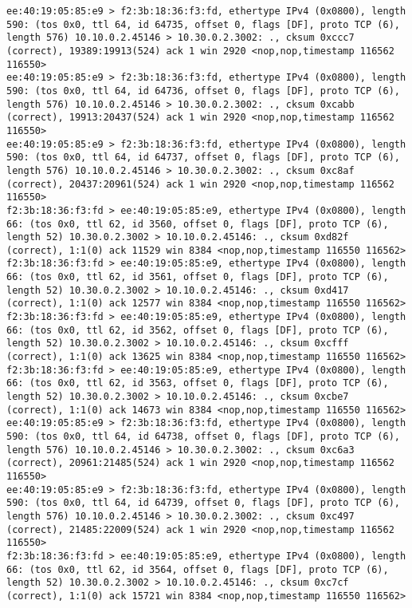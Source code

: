 \documentclass[a4paper,12pt]{article}
\begin{document}
\begin{Verbatim}
ee:40:19:05:85:e9 > f2:3b:18:36:f3:fd, ethertype IPv4 (0x0800), length 590: (tos 0x0, ttl 64, id 64735, offset 0, flags [DF], proto TCP (6), length 576) 10.10.0.2.45146 > 10.30.0.2.3002: ., cksum 0xccc7 (correct), 19389:19913(524) ack 1 win 2920 <nop,nop,timestamp 116562 116550>
ee:40:19:05:85:e9 > f2:3b:18:36:f3:fd, ethertype IPv4 (0x0800), length 590: (tos 0x0, ttl 64, id 64736, offset 0, flags [DF], proto TCP (6), length 576) 10.10.0.2.45146 > 10.30.0.2.3002: ., cksum 0xcabb (correct), 19913:20437(524) ack 1 win 2920 <nop,nop,timestamp 116562 116550>
ee:40:19:05:85:e9 > f2:3b:18:36:f3:fd, ethertype IPv4 (0x0800), length 590: (tos 0x0, ttl 64, id 64737, offset 0, flags [DF], proto TCP (6), length 576) 10.10.0.2.45146 > 10.30.0.2.3002: ., cksum 0xc8af (correct), 20437:20961(524) ack 1 win 2920 <nop,nop,timestamp 116562 116550>
f2:3b:18:36:f3:fd > ee:40:19:05:85:e9, ethertype IPv4 (0x0800), length 66: (tos 0x0, ttl 62, id 3560, offset 0, flags [DF], proto TCP (6), length 52) 10.30.0.2.3002 > 10.10.0.2.45146: ., cksum 0xd82f (correct), 1:1(0) ack 11529 win 8384 <nop,nop,timestamp 116550 116562>
f2:3b:18:36:f3:fd > ee:40:19:05:85:e9, ethertype IPv4 (0x0800), length 66: (tos 0x0, ttl 62, id 3561, offset 0, flags [DF], proto TCP (6), length 52) 10.30.0.2.3002 > 10.10.0.2.45146: ., cksum 0xd417 (correct), 1:1(0) ack 12577 win 8384 <nop,nop,timestamp 116550 116562>
f2:3b:18:36:f3:fd > ee:40:19:05:85:e9, ethertype IPv4 (0x0800), length 66: (tos 0x0, ttl 62, id 3562, offset 0, flags [DF], proto TCP (6), length 52) 10.30.0.2.3002 > 10.10.0.2.45146: ., cksum 0xcfff (correct), 1:1(0) ack 13625 win 8384 <nop,nop,timestamp 116550 116562>
f2:3b:18:36:f3:fd > ee:40:19:05:85:e9, ethertype IPv4 (0x0800), length 66: (tos 0x0, ttl 62, id 3563, offset 0, flags [DF], proto TCP (6), length 52) 10.30.0.2.3002 > 10.10.0.2.45146: ., cksum 0xcbe7 (correct), 1:1(0) ack 14673 win 8384 <nop,nop,timestamp 116550 116562>
ee:40:19:05:85:e9 > f2:3b:18:36:f3:fd, ethertype IPv4 (0x0800), length 590: (tos 0x0, ttl 64, id 64738, offset 0, flags [DF], proto TCP (6), length 576) 10.10.0.2.45146 > 10.30.0.2.3002: ., cksum 0xc6a3 (correct), 20961:21485(524) ack 1 win 2920 <nop,nop,timestamp 116562 116550>
ee:40:19:05:85:e9 > f2:3b:18:36:f3:fd, ethertype IPv4 (0x0800), length 590: (tos 0x0, ttl 64, id 64739, offset 0, flags [DF], proto TCP (6), length 576) 10.10.0.2.45146 > 10.30.0.2.3002: ., cksum 0xc497 (correct), 21485:22009(524) ack 1 win 2920 <nop,nop,timestamp 116562 116550>
f2:3b:18:36:f3:fd > ee:40:19:05:85:e9, ethertype IPv4 (0x0800), length 66: (tos 0x0, ttl 62, id 3564, offset 0, flags [DF], proto TCP (6), length 52) 10.30.0.2.3002 > 10.10.0.2.45146: ., cksum 0xc7cf (correct), 1:1(0) ack 15721 win 8384 <nop,nop,timestamp 116550 116562>

\end{Verbatim}
\end{document}
